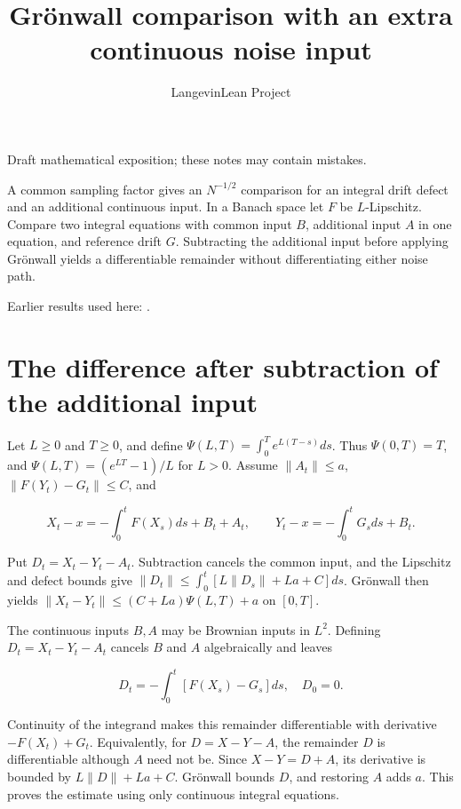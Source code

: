 \documentclass[11pt,a4paper]{article}
\title{\texorpdfstring{Grönwall comparison with an extra continuous noise input}{Grönwall comparison with an extra continuous noise input}}
\author{LangevinLean Project}
\date{}
\begin{document}
\maketitle
Draft mathematical exposition; these notes may contain mistakes.


A common sampling factor gives an \(N^{-1/2}\) comparison for an integral drift defect and an additional continuous input. In a Banach space let \(F\) be \(L\)-Lipschitz. Compare two integral equations with common input \(B\), additional input \(A\) in one equation, and reference drift \(G\). Subtracting the additional input before applying Grönwall yields a differentiable remainder without differentiating either noise path.



Earlier results used here: \cite[Section~3.43]{LangevinLean2026ULASC}.

\section{\texorpdfstring{The difference after subtraction of the additional input}{The difference after subtraction of the additional input}}


Let \(L\ge0\) and \(T\ge0\), and define \(\Psi(L,T)=\int_0^T e^{L(T-s)}ds\). Thus \(\Psi(0,T)=T\), and \(\Psi(L,T)=(e^{LT}-1)/L\) for \(L>0\). Assume \(\|A_t\|\le a\), \(\|F(Y_t)-G_t\|\le C\), and

\[X_t-x=-\int_0^tF(X_s)ds+B_t+A_t,\qquad Y_t-x=-\int_0^tG_sds+B_t.\]

Put \(D_t=X_t-Y_t-A_t\). Subtraction cancels the common input, and the Lipschitz and defect bounds give \(\|D_t\|\le\int_0^t[L\|D_s\|+La+C]ds\). Grönwall then yields \(\|X_t-Y_t\|\le(C+La)\Psi(L,T)+a\) on \([0,T]\).



The continuous inputs \(B,A\) may be Brownian inputs in \(L^2\). Defining \(D_t=X_t-Y_t-A_t\) cancels \(B\) and \(A\) algebraically and leaves

\[D_t=-\int_0^t[F(X_s)-G_s]ds,\quad D_0=0.\]

Continuity of the integrand makes this remainder differentiable with derivative \(-F(X_t)+G_t\). Equivalently, for \(D=X-Y-A\), the remainder \(D\) is differentiable although \(A\) need not be. Since \(X-Y=D+A\), its derivative is bounded by \(L\|D\|+La+C\). Grönwall bounds \(D\), and restoring \(A\) adds \(a\). This proves the estimate using only continuous integral equations.
\end{document}
